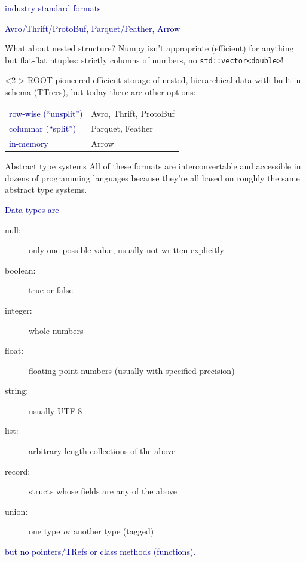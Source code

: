 \documentclass{beamer}
\begin{document}
\begin{frame}{}
\begin{center}
\LARGE \textcolor{darkblue}{industry standard formats}

\vspace{0.25 cm}
\textcolor{darkblue}{\Large Avro/Thrift/ProtoBuf, Parquet/Feather, Arrow}
\end{center}
\end{frame}

\begin{frame}{What about nested structure?}
\vspace{0.5 cm}
Numpy isn't appropriate (efficient) for anything but flat-flat ntuples: strictly columns of numbers, no {\tt\small std::vector<double>}!

\vfill
\begin{uncoverenv}<2->
ROOT pioneered efficient storage of nested, hierarchical data with built-in schema (TTrees), but today there are other options:

\begin{center}
\begin{tabular}{l l}
\textcolor{darkblue}{row-wise (``unsplit'')} & Avro, Thrift, ProtoBuf \\
\textcolor{darkblue}{columnar (``split'')} & Parquet, Feather \\
\textcolor{darkblue}{in-memory} & Arrow
\end{tabular}
\end{center}
\end{uncoverenv}
\end{frame}

\begin{frame}{Abstract type systems}
\vspace{0.25 cm}
All of these formats are interconvertable and accessible in dozens of programming languages because they're all based on roughly the same abstract type systems.

\vspace{0.25 cm}
\textcolor{darkblue}{Data types are}
\begin{description}
\item[null:] only one possible value, usually not written explicitly
\item[boolean:] true or false
\item[integer:] whole numbers
\item[float:] floating-point numbers (usually with specified precision)
\item[string:] usually UTF-8
\item[list:] arbitrary length collections of the above
\item[record:] structs whose fields are any of the above
\item[union:] one type {\it or} another type (tagged)
\end{description}
\textcolor{darkblue}{but no pointers/TRefs or class methods (functions).}
\end{frame}
\end{document}
